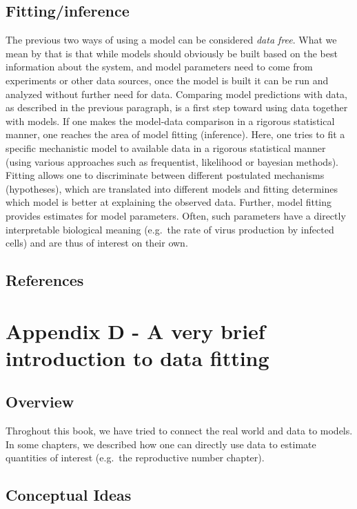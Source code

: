 \documentclass[]{book}
\theoremstyle{definition}
\theoremstyle{definition}
\theoremstyle{definition}
\theoremstyle{remark}
\begin{document}
\section{Fitting/inference}\label{fittinginference}

The previous two ways of using a model can be considered \emph{data
free}. What we mean by that is that while models should obviously be
built based on the best information about the system, and model
parameters need to come from experiments or other data sources, once the
model is built it can be run and analyzed without further need for data.
Comparing model predictions with data, as described in the previous
paragraph, is a first step toward using data together with models. If
one makes the model-data comparison in a rigorous statistical manner,
one reaches the area of model fitting (inference). Here, one tries to
fit a specific mechanistic model to available data in a rigorous
statistical manner (using various approaches such as frequentist,
likelihood or bayesian methods). Fitting allows one to discriminate
between different postulated mechanisms (hypotheses), which are
translated into different models and fitting determines which model is
better at explaining the observed data. Further, model fitting provides
estimates for model parameters. Often, such parameters have a directly
interpretable biological meaning (e.g.~the rate of virus production by
infected cells) and are thus of interest on their own.

\section{References}\label{references-21}

\chapter{Appendix D - A very brief introduction to data
fitting}\label{appendix-d---a-very-brief-introduction-to-data-fitting}

\section{Overview}\label{overview-2}

Throghout this book, we have tried to connect the real world and data to
models. In some chapters, we described how one can directly use data to
estimate quantities of interest (e.g.~the reproductive number chapter).

\section{Conceptual Ideas}\label{conceptual-ideas}
\end{document}
